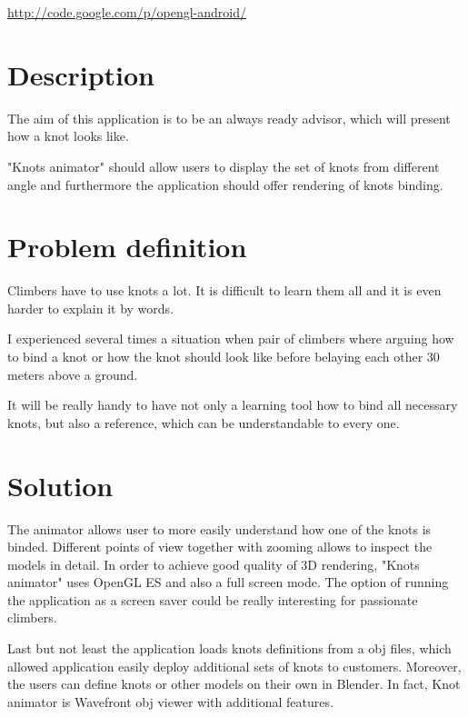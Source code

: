 \label{cha:Opengl-Android application}
\url{http://code.google.com/p/opengl-android/}

\section*{Description} %
\label{sec:Description}
The aim of this application is to be an always ready advisor, which will
present how a knot looks like. 

"Knots animator" should  allow users to display the set of knots from different angle
and furthermore the application should offer rendering of knots binding.


\section*{Problem definition} %
\label{sec:Problem definition}
Climbers have to use knots a lot. It is difficult to learn them all
and it is even harder to explain it by words.

I experienced several times a situation when pair of climbers
where arguing how to bind a knot or how the knot should look like 
before belaying each other 30 meters above a ground.

It will be really handy to have not only a learning tool
how to bind all necessary knots, but also a reference, 
which can be understandable to every one.


\section*{Solution} %
\label{sec:Solution}

The animator allows user to more easily understand how one of the knots is binded.
Different points of view together with zooming allows to inspect the models in detail. 
In order to achieve good quality of 3D rendering, "Knots animator" 
uses OpenGL ES and also a full screen mode. 
The option of running the application as a screen saver could be really interesting
for passionate climbers.

Last but not least the application loads knots definitions from a obj files,
which allowed application easily deploy additional sets of knots to customers.
Moreover, the users can define knots or other models on their own in Blender.
In fact, Knot animator is Wavefront obj viewer with additional features.

